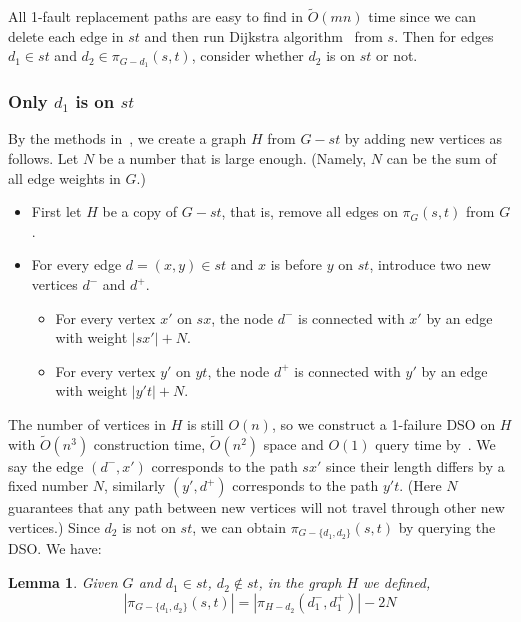 \documentclass[11pt]{article}
\theoremstyle{plain}
\newtheorem{lemma}[theorem]{Lemma}
\theoremstyle{definition}
\newcommand{\set}[1]{\{ #1 \}}
\newcommand{\og}[3]{\pi_{G-#3}\left(#1,#2\right)}
\newcommand{\hg}[3]{\pi_{H-#3}\left(#1,#2\right)}
\begin{document}
All 1-fault replacement paths are easy to find in $\tilde{O}(mn)$ time since we can delete each edge in $st$ and then run Dijkstra algorithm~\cite{Dij59} from $s$. Then for edges $d_1\in st$ and $d_2\in \og{s}{t}{d_1}$, consider whether $d_2$ is on $st$ or not.

\subsubsection{Only $d_1$ is on $st$}\label{sec:one-2FRP}

By the methods in~\cite{WWX22}, we create a graph $H$ from $G-st$ by adding new vertices as follows. Let $N$ be a number that is large enough. (Namely, $N$ can be the sum of all edge weights in $G$.)
\begin{itemize}
    \item First let $H$ be a copy of $G-st$, that is, remove all edges on $\pi_G(s,t)$ from $G$.
    \item For every edge $d=(x,y)\in st$ and $x$ is before $y$ on $st$, introduce two new vertices $d^-$ and $d^+$. 
    \begin{itemize}
        \item For every vertex $x'$ on $sx$, the node $d^-$ is connected with $x'$ by an edge with weight $|sx'|+N$.
        \item For every vertex $y'$ on $yt$, the node $d^+$ is connected with $y'$ by an edge with weight $|y't|+N$.
    \end{itemize}
\end{itemize}

The number of vertices in $H$ is still $O(n)$, so we construct a 1-failure DSO on $H$ with $\tilde{O}(n^3)$ construction time, $\tilde{O}(n^2)$ space and $O(1)$ query time by~\cite{2009A}. We say the edge $(d^-,x')$ corresponds to the path $sx'$ since their length differs by a fixed number $N$, similarly $(y',d^+)$ corresponds to the path $y't$. (Here $N$ guarantees that any path between new vertices will not travel through other new vertices.) Since $d_2$ is not on $st$, we can obtain $\og{s}{t}{\set{d_1,d_2}}$ by querying the DSO. We have:
\begin{lemma} \label{lemma:1edge}
    Given $G$ and $d_1\in st$, $d_2\notin st$, in the graph $H$ we defined,
    $$ |\og{s}{t}{\set{d_1, d_2}}| = |\hg{d_1^-}{d_1^+}{d_2}| - 2N$$
\end{lemma}
\end{document}
